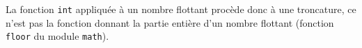 La fonction \texttt{int} appliquée à un nombre flottant procède donc à une troncature, ce n'est pas la fonction donnant la partie entière d'un nombre flottant (fonction \texttt{floor} du module \texttt{math}).
%
%
%
